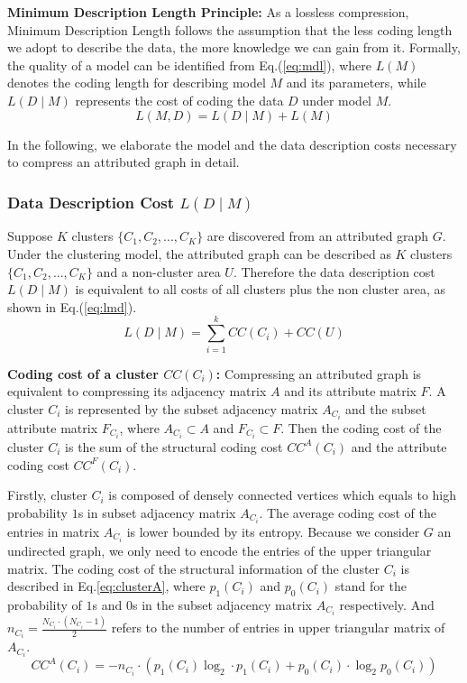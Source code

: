 \noindent \textbf{Minimum Description Length Principle: }
As a lossless compression, Minimum Description Length \cite{mdlbook} follows the assumption that the less coding length we adopt to describe the data, the more knowledge we can gain from it. Formally, the quality of a model can be identified from Eq.(\ref{eq:mdl}), where $L(M)$ denotes the coding length for describing model $M$ and its parameters, while $L(D\mid M)$ represents the cost of coding the data $D$ under model $M$.
\begin{equation}
L(M,D) = L(D\mid M) + L(M)
\label{eq:mdl}
\end{equation}

In the following, we elaborate the model and the data description costs necessary to compress an attributed graph in detail. 

\subsubsection{Data Description Cost $L(D\mid M)$}
\noindent Suppose $K$ clusters $\{C_1,C_2,...,C_K \}$ are discovered from an attributed graph $G$. Under the clustering model, the attributed graph can be described as $K$ clusters $\{C_1,C_2,...,C_K \}$ and a non-cluster area $U$. Therefore the data description cost $L(D\mid M)$ is equivalent to all costs of all clusters plus the non cluster area, as shown in Eq.(\ref{eq:lmd}).
\begin{equation}
L(D\mid M) = \sum_{i=1}^kCC(C_i) + CC(U)
\label{eq:lmd}
\end{equation}

\noindent \textbf{Coding cost of a cluster $CC(C_i)$:} Compressing an attributed graph is equivalent to compressing its adjacency matrix $A$ and its attribute matrix $F$. A cluster $C_i$ is represented by the subset adjacency matrix $A_{C_i}$ and the subset attribute matrix $F_{C_i}$, where $A_{C_i} \subset A$ and $F_{C_i} \subset F$. Then the coding cost of the cluster $C_i$ is the sum of the structural coding cost $CC^A(C_i)$ and the attribute coding cost $CC^F(C_i)$. 

Firstly, cluster $C_i$ is composed of densely connected vertices which equals to high probability $1$s in subset adjacency matrix $A_{C_i}$. The average coding cost of the entries in matrix $A_{C_i}$ is lower bounded by its entropy. Because we consider $G$ an undirected graph,  we only need to encode the entries of the upper triangular matrix. The coding cost of the structural information of the cluster $C_i$ is described in Eq.\ref{eq:clusterA}, where $p_1(C_i)$ and $p_0(C_i)$ stand for the probability of $1$s and $0$s in the subset adjacency matrix $A_{C_i}$ respectively. 
And $n_{C_i}=\frac{N_{C_i}\cdot(N_{C_i}-1)}{2}$ refers to the number of entries in upper triangular matrix of $A_{C_i}$. 
\begin{equation}
CC^A(C_i)= - n_{C_i}\cdot (p_1(C_i) \log_2\cdot p_1(C_i) + p_0(C_i)\cdot \log_2 p_0(C_i))
\label{eq:clusterA}
\end{equation}

